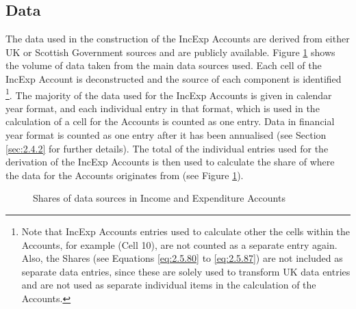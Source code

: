 \subsection{Data}
\label{sec:2.4.3}

\bigskip

The data used in the construction of the IncExp Accounts are derived from either UK or Scottish Government sources and are publicly available. Figure \ref{fig:2.4.1} shows the volume of data taken from the main data sources used. Each cell of the IncExp Account is deconstructed and the source of each component is identified \footnote{Note that IncExp Accounts entries used to calculate other the cells within the Accounts, for example (Cell 10), are not counted as a separate entry again. Also, the Shares (see Equations \ref{eq:2.5.80} to \ref{eq:2.5.87}) are not included as separate data entries, since these are solely used to transform UK data entries and are not used as separate individual items in the calculation of the Accounts.}. The majority of the data used for the IncExp Accounts is given in calendar year format, and each individual entry in that format, which is used in the calculation of a cell for the Accounts is counted as one entry. Data in financial year format is counted as one entry after it has been annualised (see Section \ref{sec:2.4.2} for further details). The total of the individual entries used for the derivation of the IncExp Accounts is then used to calculate the share of where the data for the Accounts originates from (see Figure \ref{fig:2.4.1}).

\bigskip
\begin{figure}[H] \caption{Shares of data sources in Income and Expenditure Accounts}
 \label{fig:2.4.1}
\end{figure}
\bigskip

